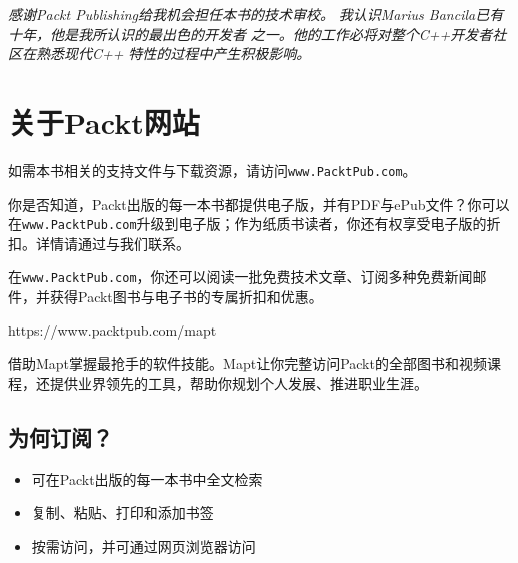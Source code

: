 \textit{感谢Packt Publishing给我机会担任本书的技术审校。} \textit{我认识Marius Bancila已有十年，他是我所认识的最出色的开发者} \textit{之一。他的工作必将对整个C++开发者社区在熟悉现代C++} \textit{特性的过程中产生积极影响。}



\section*{关于Packt网站}



如需本书相关的支持文件与下载资源，请访问\texttt{www.\allowbreak{}PacktPub.\allowbreak{}com}。



你是否知道，Packt出版的每一本书都提供电子版，并有PDF与ePub文件？你可以在\texttt{www.\allowbreak{}PacktPub.\allowbreak{}com}升级到电子版；作为纸质书读者，你还有权享受电子版的折扣。详情请通过与我们联系。



在\texttt{www.\allowbreak{}PacktPub.\allowbreak{}com}，你还可以阅读一批免费技术文章、订阅多种免费新闻邮件，并获得Packt图书与电子书的专属折扣和优惠。






https://\allowbreak{}www.\allowbreak{}packtpub.\allowbreak{}com/\allowbreak{}mapt



借助Mapt掌握最抢手的软件技能。Mapt让你完整访问Packt的全部图书和视频课程，还提供业界领先的工具，帮助你规划个人发展、推进职业生涯。



\subsection*{为何订阅？}



\begin{itemize}
\item 可在Packt出版的每一本书中全文检索



\item 复制、粘贴、打印和添加书签



\item 按需访问，并可通过网页浏览器访问

\end{itemize}


